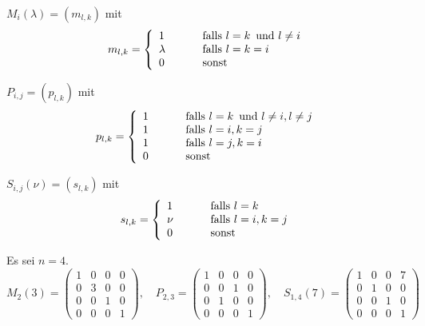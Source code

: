 $M_i(\lambda) = \left(m_{l,k} \right)$ mit
  	$$ m_{l,k} = \left\{ \begin{array} {l c l} 1 & \quad & \textrm{ falls } l = k \, 
  	\textrm{ und } l \neq i \\
  	\lambda & & \textrm{ falls } l = k = i \\
  	0 & & \textrm{ sonst} \end{array} \right. $$

$P_{i,j} = \left(p_{l,k} \right)$ mit
  	$$  p_{l,k} = \left\{ \begin{array} {l c l} 1 & \quad & \textrm{ falls } l = k \, 
  	\textrm{ und } l \neq i, l \neq j \\
  	1 & & \textrm{ falls } l = i, k = j \\
  	1 & & \textrm{ falls } l = j, k = i \\
  	0 & & \textrm{ sonst} \end{array} \right. $$

$S_{i,j}(\nu) = \left(s_{l,k} \right)$ mit 
  	$$ s_{l,k} = \left\{ \begin{array} {l c l} 1 & \quad & \textrm{ falls } l = k \\
  	\nu & & \textrm{ falls } l = i, k = j \\
  	0 & & \textrm{ sonst} \end{array} \right. $$

\begin{beispiel} Es sei $n = 4$. 
  	$$ M_2\left(3\right) = \left( \begin{smallmatrix} 1 & 0 & 0 & 0 \\ 
     	0 & 3 & 0 & 0 \\ 0 & 0 & 1 & 0 \\ 0 & 0 & 0 & 1 \end{smallmatrix} \right), 
  	\quad P_{2,3} = \left( \begin{smallmatrix} 1 & 0 & 0 & 0 \\ 
     	0 & 0 & 1 & 0 \\ 0 & 1 & 0 & 0 \\ 0 & 0 & 0 & 1 \end{smallmatrix} \right), \quad 
  	S_{1,4}(7) = \left( \begin{smallmatrix} 1 & 0 & 0 & 7 \\ 
     	0 & 1 & 0 & 0 \\ 0 & 0 & 1 & 0 \\ 0 & 0 & 0 & 1 \end{smallmatrix} \right) $$ 
\end{beispiel}

